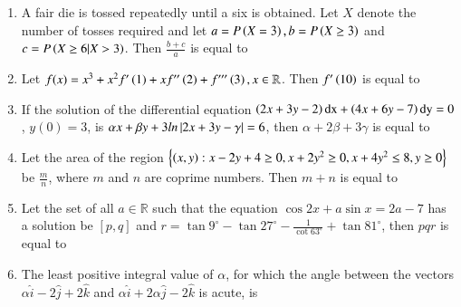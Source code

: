 \documentclass[journal]{IEEEtran}
\begin{document}
\begin{enumerate}[start=16]
\item A fair die is tossed repeatedly until a six is obtained. Let $X$ denote the number of tosses required and let $a=P\left(X=3\right), b=P\left(X\geq 3\right)$ and $c=P\left(X\geq 6 |X>3\right)$. Then $\frac{b+c}{a}$ is equal to \underline{\hspace{1cm}}\\

\item Let $f(x)=x^3+x^2f'\left(1\right)+xf''\left(2\right)+f'''\left(3\right), x \in \mathbb R$. Then $f'\left(10\right)$ is equal to \underline{\hspace{1cm}}\\

\item If the solution of the differential equation $\left(2x+3y-2\right)\text{dx}+\left(4x+6y-7\right)\text{dy}=0$, $y(0)=3$, is $\alpha x+\beta y+3 ln\left\vert2x+3y-\gamma\right\vert=6$, then $\alpha+2\beta+3\gamma$ is equal to \underline{\hspace{1cm}}\\

\item Let the area of the region $\left\{\left(x,y\right): x-2y+4\geq 0,x+2y^2\geq 0,x+4y^2\leq 8,y\geq 0\right\}$ be $\frac{m}{n}$, where $m$ and $n$ are coprime numbers. Then $m+n$ is equal to \underline{\hspace{1cm}}\\

\item Let the set of all $a\in \mathbb R$ such that the equation $\cos 2x+a\sin x=2a-7$ has a solution be ${[p,q]}$ and $r=\tan 9^{\circ}-\tan 27^{\circ}-\frac{1}{\cot 63^{\circ}}+\tan 81^{\circ}$, then $pqr$ is equal to \underline{\hspace{1cm}}\\
  
\item The least positive integral value of $\alpha$, for which the angle between the vectors $\alpha\hat{i}-2\hat{j}+2\hat{k}$ and $\alpha\hat{i}+2\alpha\hat{j}-2\hat{k}$ is acute, is \underline{\hspace{1cm}}\\

\end{enumerate}
\end{document}
